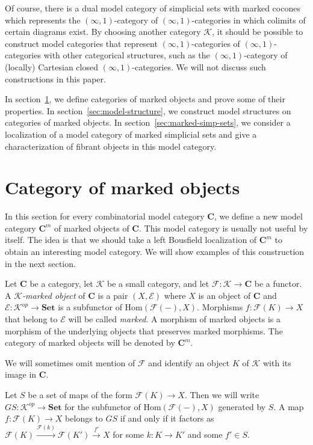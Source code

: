 \documentclass[reqno]{amsart}
\theoremstyle{definition}
\theoremstyle{remark}
\newcommand{\cat}[1]{\mathbf{#1}}
\newcommand{\C}{\cat{C}}
\newcommand{\Set}{\cat{Set}}
\newcommand{\K}{$\mathcal{K}$}
\newcommand{\Hom}{\mathrm{Hom}}
\numberwithin{figure}{section}
\begin{document}
Of course, there is a dual model category of simplicial sets with marked cocones which represents the $(\infty,1)$-category of $(\infty,1)$-categories in which colimits of certain diagrams exist.
By choosing another category $\mathcal{K}$, it should be possible to construct model categories that represent $(\infty,1)$-categories of $(\infty,1)$-categories with other categorical structures,
such as the $(\infty,1)$-category of (locally) Cartesian closed $(\infty,1)$-categories.
We will not discuss such constructions in this paper.

In section~\ref{sec:marked}, we define categories of marked objects and prove some of their properties.
In section~\ref{sec:model-structure}, we construct model structures on categories of marked objects.
In section~\ref{sec:marked-simp-sets}, we consider a localization of a model category of marked simplicial sets and give a characterization of fibrant objects in this model category.

\section{Category of marked objects}
\label{sec:marked}

In this section for every combinatorial model category $\C$, we define a new model category $\C^m$ of marked objects of $\C$.
This model category is usually not useful by itself.
The idea is that we should take a left Bousfield localization of $\C^m$ to obtain an interesting model category.
We will show examples of this construction in the next section.

\begin{defn}
Let $\C$ be a category, let $\mathcal{K}$ be a small category, and let $\mathcal{F} : \mathcal{K} \to \C$ be a functor.
A \emph{\K-marked object} of $\C$ is a pair $(X,\mathcal{E})$ where $X$ is an object of $\C$ and $\mathcal{E} : \mathcal{K}^{op} \to \Set$ is a subfunctor of $\Hom(\mathcal{F}(-),X)$.
Morphisms $f : \mathcal{F}(K) \to X$ that belong to $\mathcal{E}$ will be called \emph{marked}.
A morphism of marked objects is a morphism of the underlying objects that preserves marked morphisms.
The category of marked objects will be denoted by $\C^m$.
\end{defn}

We will sometimes omit mention of $\mathcal{F}$ and identify an object $K$ of $\mathcal{K}$ with its image in $\C$.

Let $S$ be a set of maps of the form $\mathcal{F}(K) \to X$.
Then we will write $GS : \mathcal{K}^{op} \to \Set$ for the subfunctor of $\Hom(\mathcal{F}(-),X)$ generated by $S$.
A map $f : \mathcal{F}(K) \to X$ belongs to $GS$ if and only if it factors as $\mathcal{F}(K) \xrightarrow{\mathcal{F}(k)} \mathcal{F}(K') \xrightarrow{f'} X$
for some $k : K \to K'$ and some $f' \in S$.
\end{document}

